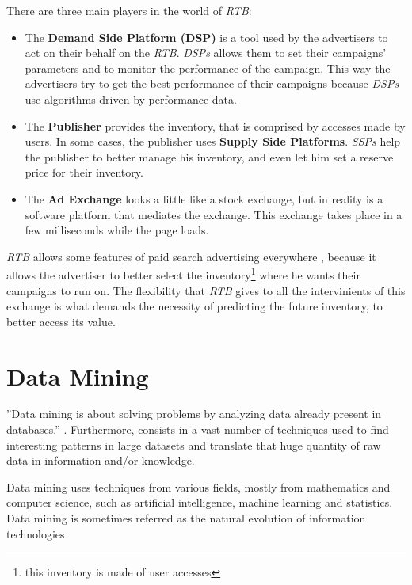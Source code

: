 There are three main players in the world of \emph{RTB}:
\begin{itemize}
\item\label{itm:dsp} The \textbf{Demand Side Platform (DSP)} is a tool used by the advertisers to act on their behalf on the \emph{RTB}. \emph{DSPs} allows them to set
their campaigns' parameters and to monitor the performance of the campaign. This way the advertisers try to get the best performance of their campaigns because 
\emph{DSPs} use algorithms driven by performance data.\cite{Gern201230}
\item\label{itm:ssp} The \textbf{Publisher} provides the inventory, that is comprised by accesses made by users. In some cases, the publisher uses \textbf{Supply Side Platforms}.
\emph{SSPs} help the publisher to better manage his inventory, and even let him set a reserve price for their inventory.\cite{Yuan:2013:RBO:2501040.2501980}
\item\label{itm:adex} The \textbf{Ad Exchange} looks a little like a stock exchange, but in reality is a software platform that mediates the exchange. This exchange takes place in
a few milliseconds while the page loads.
\end{itemize}

\emph{RTB} allows some features of paid search advertising everywhere \cite{Gern201230}, because it allows the advertiser to better select
the inventory\footnote{ this inventory is made of user accesses} where he wants their campaigns to run on.
The flexibility that \emph{RTB} gives to all the intervinients of this exchange is what demands the necessity of predicting the future inventory, to
better access its value.



\section{Data Mining}\label{sec:datamining}
''Data mining is about solving problems by analyzing data already present in databases.''\cite[p. 5]{Witten:2005:DMP:1205860}
. Furthermore, consists in a vast number of techniques used to find interesting patterns in large datasets and translate
that huge quantity of raw data in information and/or knowledge. 

Data mining uses techniques from various fields, mostly from mathematics and computer science,
such as artificial intelligence, machine learning and statistics.
Data mining is sometimes referred as the natural evolution of information technologies \cite[p. 1]{HanKam06}

